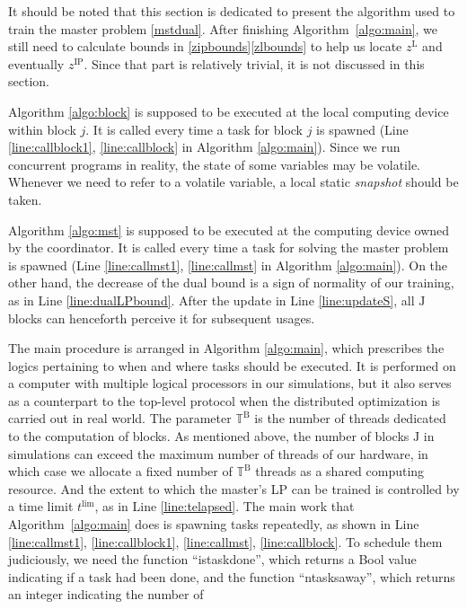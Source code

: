 \documentclass[journal]{IEEEtran}
\begin{document}
\par
It should be noted that this section is dedicated to present the algorithm used to train the master problem \eqref{mstdual}.
After finishing Algorithm~\ref{algo:main}, we still need to calculate bounds in \eqref{zipbounds}\eqref{zlbounds} to help us locate $z^\mathrm{L}$ and eventually $z^\mathrm{IP}$. Since that part is relatively trivial, it is not discussed in this section.
\par
Algorithm \ref{algo:block} is supposed to be executed at the local computing device
within block $j$.
It is called every time a task for block $j$ is spawned
(Line \ref{line:callblock1}, \ref{line:callblock} in Algorithm \ref{algo:main}).
Since we run concurrent programs in reality, the state of some variables may be volatile.
Whenever we need to refer to a volatile variable, a local static \textit{snapshot} should be taken.
\par
Algorithm \ref{algo:mst} is supposed to be executed at the computing device owned by the coordinator.
It is called every time a task for solving the master problem is spawned
(Line \ref{line:callmst1}, \ref{line:callmst} in Algorithm \ref{algo:main}).
On the other hand, the decrease of the dual bound is a sign of normality of our training, as in Line \ref{line:dualLPbound}.
After the update in Line \ref{line:updateS}, all $\mathrm{J}$ blocks can henceforth perceive it for subsequent usages.
\par
The main procedure is arranged in Algorithm \ref{algo:main}, which prescribes the logics
pertaining to when and where tasks should be executed.
It is performed on a computer with multiple logical processors in our simulations, but it also
serves as a counterpart to the top-level protocol when the distributed optimization is carried out
in real world.
The parameter $\mathbb{T}^\mathrm{B}$ is the number of threads
dedicated to the computation of blocks. As mentioned above, the number of blocks $\mathrm{J}$
in simulations can exceed the maximum number of threads of our hardware, in which case
we allocate a fixed number of $\mathbb{T}^\mathrm{B}$ threads as a shared computing resource.
And the extent to which the master's LP can be trained is controlled by a time limit $t^\text{lim}$,
as in Line \ref{line:telapsed}.
The main work that Algorithm~\ref{algo:main} does is spawning tasks repeatedly, as shown in Line
\ref{line:callmst1}, \ref{line:callblock1}, \ref{line:callmst}, \ref{line:callblock}.
To schedule them judiciously, we need the function ``istaskdone'', which returns a Bool value indicating
if a task had been done, and the function ``ntasksaway'', which returns an integer indicating the number of
\end{document}
